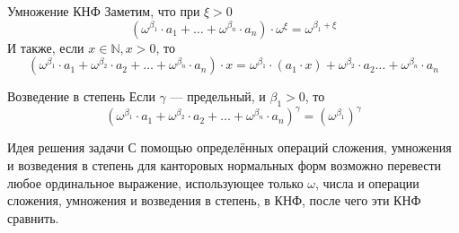 \documentclass[aspectratio=169]{beamer}
\begin{document}
\begin{frame}{Умножение КНФ}
Заметим, что при $\xi > 0$ 
$$(\omega^{\beta_1}\cdot a_1 + \dots + \omega^{\beta_n}\cdot a_n) \cdot \omega^{\xi} = \omega^{\beta_1 + \xi}$$
И также, если $x\in\mathbb{N}, x > 0$, то
$$(\omega^{\beta_1}\cdot a_1 + \omega^{\beta_2}\cdot a_2 + \dots + \omega^{\beta_n}\cdot a_n) \cdot x = \omega^{\beta_1}\cdot (a_1 \cdot x) + \omega^{\beta_2}\cdot a_2\dots + \omega^{\beta_n}\cdot a_n$$
\end{frame}

\begin{frame}{Возведение в степень}
Если $\gamma$ --- предельный, и $\beta_1 > 0$, то
$$(\omega^{\beta_1}\cdot a_1+\omega^{\beta_2}\cdot a_2+\dots+\omega^{\beta_n}\cdot a_n)^\gamma = (\omega^{\beta_1})^\gamma$$
\end{frame}

\begin{frame}{Идея решения задачи}
С помощью определённых операций сложения, умножения и возведения в степень для канторовых нормальных форм 
возможно перевести любое ординальное выражение, использующее только $\omega$, числа и операции сложения,
умножения и возведения в степень, в КНФ, после чего эти КНФ сравнить.
\end{frame}
\end{document}
